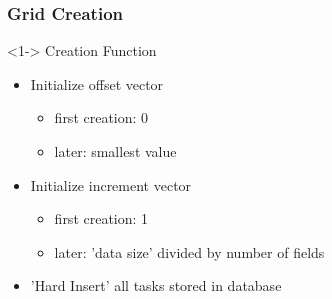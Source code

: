 \begin{frame}
	\frametitle{Grid Creation}

	\begin{block}<1-> {Creation Function}
		\begin{itemize}
			\item<2-> {Initialize offset vector}
			\begin{itemize}
				\item<3-> {first creation: 0}
				\item<4-> {later: smallest value}
			\end{itemize}
			\item<5-> {Initialize increment vector}
			\begin{itemize}
				\item<6->{first creation: 1}
				\item<7->{later: 'data size' divided by number of fields}
			\end{itemize}
			\item<8-> {'Hard Insert' all tasks stored in database}			
		\end{itemize}
	\end{block}
\end{frame}

